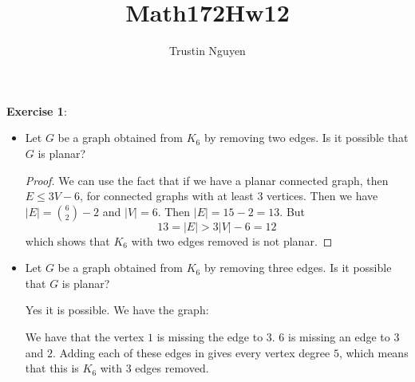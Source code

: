 \documentclass{article}
\title{Math172Hw12}
\author{Trustin Nguyen}
\begin{document}
    \maketitle

\reversemarginpar

\textbf{Exercise 1}: 
    \begin{itemize}
        \item Let $G$ be a graph obtained from $K_{6}$ by removing two edges. Is it possible that $G$ is planar?
            \begin{proof}
                We can use the fact that if we have a planar connected graph, then $E \leq 3V - 6$, for connected graphs with at least $3$ vertices. Then we have $\lvert E \rvert = \binom{6}{2} - 2$ and $\lvert V \rvert = 6$. Then $\lvert E \rvert = 15 - 2 = 13$. But 
                    \begin{equation*}
                        13 = \lvert E \rvert > 3\lvert V \rvert - 6 = 12
                    \end{equation*}
                which shows that $K_{6}$ with two edges removed is not planar.
            \end{proof}

        \item Let $G$ be a graph obtained from $K_{6}$ by removing three edges. Is it possible that $G$ is planar? 
            \begin{answer}
                Yes it is possible. We have the graph:
                    \begin{fixedfigure}
                    \end{fixedfigure}
                We have that the vertex $1$ is missing the edge to $3$. $6$ is missing an edge to $3$ and $2$. Adding each of these edges in gives every vertex degree $5$, which means that this is $K_{6}$ with $3$ edges removed.
            \end{answer}
    \end{itemize}
\end{document}
